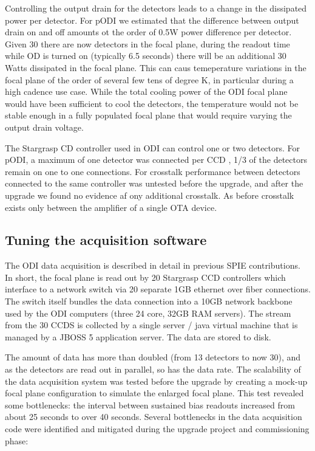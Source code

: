 \documentclass[]{spieman}
\begin{document}
Controlling the output drain for the detectors leads to a change in the
dissipated power per detector. For pODI we estimated that the difference between
output drain on and off amounts ot the order of 0.5W power difference per
detector. Given 30 there are now detectors in the focal plane, during the
readout time while OD is turned on (typically 6.5 seconds) there will be an
additional 30 Watts dissipated in the focal plane. This can caus temeperature
variations in the focal plane of the order of several  few tens of  degree K, in
particular during a high cadence use case. While the total cooling power of the
ODI focal plane would have been sufficient to cool the detectors, the
temperature would not be stable enough in a fully populated focal plane that
would require varying the output drain voltage.


The Stargrasp CD controller used in ODI can control one or two detectors. For
pODI, a maximum of one detector was connected per CCD , 1/3 of the detectors
remain on one to one connections.  For crosstalk performance between detectors
connected to the same controller was untested before the upgrade, and after the
upgrade we found no evidence af ony additional crosstalk. As before crosstalk
exists only between the amplifier of a single OTA device.



\subsection{Tuning the acquisition software}

The ODI data acquisition is described in detail in previous SPIE
 contributions\cite{Yeatts2008,Yeatts2010}.
In short, the focal plane is read out by 20 Stargrasp CCD controllers which
interface to a network switch via 20 separate 1GB ethernet over fiber
connections. The switch itself bundles the data connection into a 10GB network
backbone used by the ODI computers (three 24 core, 32GB RAM servers). The stream
from the 30 CCDS is collected by a single server / java virtual machine that is
managed by a JBOSS 5 application server. The data are stored to disk.

The amount of data has more than doubled (from 13 detectors to now 30), and as
the detectors are read out in parallel, so has the data rate. The scalability of
the data acquisition system was tested before the upgrade by creating a mock-up
focal plane  configuration to simulate the enlarged focal plane. This test
revealed some bottlenecks: the interval between sustained bias readouts
increased from about 25 seconds to over 40 seconds. Several bottlenecks in the
data acquisition code were identified and mitigated during the upgrade project
and commissioning phase:
\end{document}
